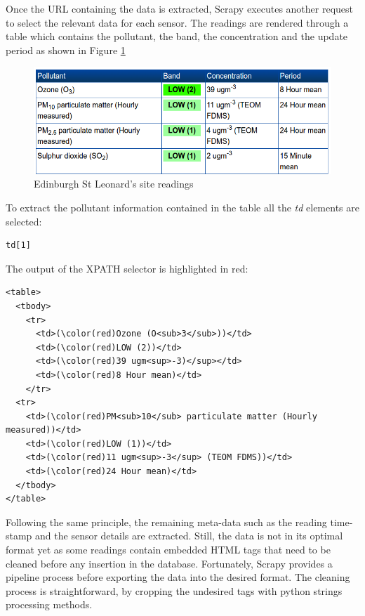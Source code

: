 Once the URL containing the data is extracted, Scrapy executes another request to select the relevant data for each sensor. The readings are rendered through a table which contains the pollutant, the band, the concentration and the update period as shown in Figure \ref{fig:pollution_site readings}

\begin{figure}[H]
\begin{adjustbox}{width=.5\textwidth,center=\textwidth}
  \centering
  \includegraphics[scale=1]{images/site_readings.png}
\end{adjustbox}
  \caption[Edinburgh St Leonard's site readings]{Edinburgh St Leonard's site readings \footnotemark}
  \label{fig:pollution_site readings}
\end{figure}

To extract the pollutant information contained in the table all the \textit{td} elements are selected: 

{\centering
\begin{BVerbatim}
td[1]
\end{BVerbatim}
\par
}\bigskip

The output of the XPATH selector is highlighted in red: 

\begin{Verbatim}[fontsize=\small,commandchars=\\\(\)]
<table>
  <tbody>
    <tr>
      <td>(\color(red)Ozone (O<sub>3</sub>))</td>
      <td>(\color(red)LOW (2))</td>
      <td>(\color(red)39 ugm<sup>-3)</sup></td>
      <td>(\color(red)8 Hour mean)</td>
    </tr>
  <tr>
    <td>(\color(red)PM<sub>10</sub> particulate matter (Hourly measured))</td>
    <td>(\color(red)LOW (1))</td>
    <td>(\color(red)11 ugm<sup>-3</sup> (TEOM FDMS))</td>
    <td>(\color(red)24 Hour mean)</td>
  </tbody>
</table>                
\end{Verbatim}

Following the same principle, the remaining meta-data such as the reading time-stamp and the sensor details are extracted. Still, the data is not in its optimal format yet as some readings contain embedded HTML tags that need to be cleaned before any insertion in the database. Fortunately, Scrapy provides a pipeline process before exporting the data into the desired format. The cleaning process is straightforward, by cropping the undesired tags with python strings processing methods. 

